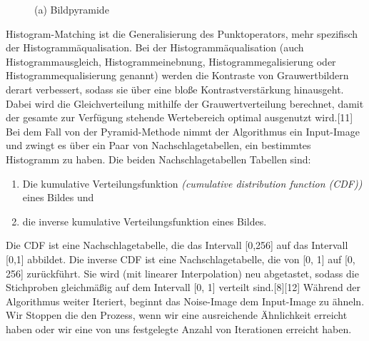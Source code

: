 \documentclass[12pt]{report}
\begin{document}
\begin{figure}[H]
    \centering
    \caption{(a) Bildpyramide}%
\end{figure}

Histogram-Matching ist die Generalisierung des Punktoperators, mehr spezifisch der Histogrammäqualisation.
Bei der Histogrammäqualisation {(auch Histogrammausgleich, Histogrammeinebnung, Histogrammegalisierung oder Histogrammequalisierung genannt)}
werden die Kontraste von Grauwertbildern derart verbessert, sodass sie über eine bloße Kontrastverstärkung hinausgeht.
Dabei wird die Gleichverteilung mithilfe der Grauwertverteilung berechnet, damit der gesamte zur Verfügung stehende Wertebereich optimal ausgenutzt wird.{[11]}
Bei dem Fall von der Pyramid-Methode nimmt der Algorithmus ein Input-Image und zwingt es über ein Paar von Nachschlagetabellen, ein bestimmtes Histogramm zu haben.
Die beiden Nachschlagetabellen Tabellen sind:

\begin{enumerate}
    \item Die kumulative Verteilungsfunktion \textit{(cumulative distribution function (CDF))} eines Bildes und
    \item die inverse kumulative Verteilungsfunktion eines Bildes.
  \end{enumerate}

Die CDF ist eine Nachschlagetabelle, die das Intervall {[0,256]} auf das Intervall {[0,1]} abbildet.
Die inverse CDF ist eine Nachschlagetabelle, die von {[0, 1]} auf {[0, 256]} zurückführt.
Sie wird {(mit linearer Interpolation)} neu abgetastet,
sodass die Stichproben gleichmäßig auf dem Intervall {[0, 1]} verteilt sind.{[8][12]}
\newline
Während der Algorithmus weiter Iteriert, beginnt das Noise-Image dem Input-Image zu ähneln.
Wir Stoppen die den Prozess, wenn wir eine ausreichende Ähnlichkeit erreicht haben oder wir eine von uns festgelegte Anzahl von Iterationen erreicht haben.
\end{document}
